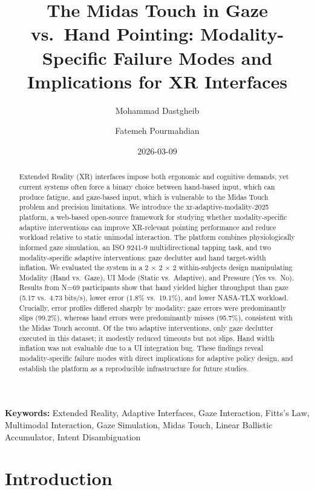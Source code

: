 \documentclass[
  11pt,
  11pt,
  letterpaper]{article}
\title{The Midas Touch in Gaze vs.~Hand Pointing: Modality-Specific
Failure Modes and Implications for XR Interfaces}
\author{Mohammad Dastgheib \and Fatemeh Pourmahdian}
\date{2026-03-09}
\begin{document}
\maketitle
\begin{abstract}
Extended Reality (XR) interfaces impose both ergonomic and cognitive
demands, yet current systems often force a binary choice between
hand-based input, which can produce fatigue, and gaze-based input, which
is vulnerable to the Midas Touch problem and precision limitations. We
introduce the xr-adaptive-modality-2025 platform, a web-based
open-source framework for studying whether modality-specific adaptive
interventions can improve XR-relevant pointing performance and reduce
workload relative to static unimodal interaction. The platform combines
physiologically informed gaze simulation, an ISO 9241-9 multidirectional
tapping task, and two modality-specific adaptive interventions: gaze
declutter and hand target-width inflation. We evaluated the system in a
2 × 2 × 2 within-subjects design manipulating Modality (Hand vs.~Gaze),
UI Mode (Static vs.~Adaptive), and Pressure (Yes vs.~No). Results from
N=69 participants show that hand yielded higher throughput than gaze
(5.17 vs.~4.73 bits/s), lower error (1.8\% vs.~19.1\%), and lower
NASA-TLX workload. Crucially, error profiles differed sharply by
modality: gaze errors were predominantly slips (99.2\%), whereas hand
errors were predominantly misses (95.7\%), consistent with the Midas
Touch account. Of the two adaptive interventions, only gaze declutter
executed in this dataset; it modestly reduced timeouts but not slips.
Hand width inflation was not evaluable due to a UI integration bug.
These findings reveal modality-specific failure modes with direct
implications for adaptive policy design, and establish the platform as a
reproducible infrastructure for future studies.
\end{abstract}


\vspace{-0.5em}

\textbf{Keywords:} Extended Reality, Adaptive Interfaces, Gaze
Interaction, Fitts's Law, Multimodal Interaction, Gaze Simulation, Midas
Touch, Linear Ballistic Accumulator, Intent Disambiguation

\newpage

\section{Introduction}\label{introduction}
\end{document}

